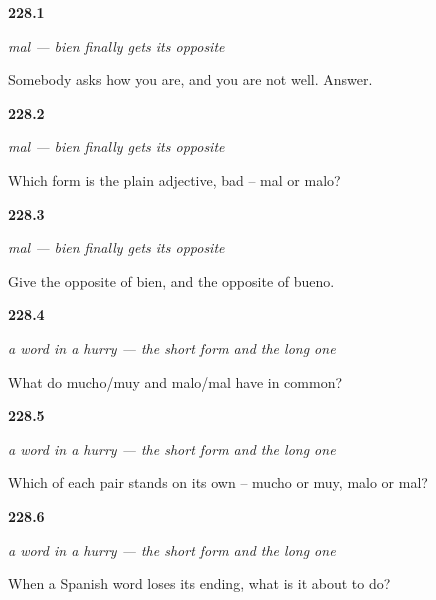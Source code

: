 \noindent\begin{minipage}[t]{\linewidth}
\raggedright
\hypertarget{review-ES-C60-mal-say}{\textbf{228.1}} \emph{mal — bien finally gets its opposite}\par
\small Somebody asks how you are, and you are not well. Answer.
\end{minipage}\par\medskip

\noindent\begin{minipage}[t]{\linewidth}
\raggedright
\hypertarget{review-ES-C60-mal-adj}{\textbf{228.2}} \emph{mal — bien finally gets its opposite}\par
\small Which form is the plain adjective, bad -- mal or malo?
\end{minipage}\par\medskip

\noindent\begin{minipage}[t]{\linewidth}
\raggedright
\hypertarget{review-ES-C60-mal-pairs}{\textbf{228.3}} \emph{mal — bien finally gets its opposite}\par
\small Give the opposite of bien, and the opposite of bueno.
\end{minipage}\par\medskip

\noindent\begin{minipage}[t]{\linewidth}
\raggedright
\hypertarget{review-ES-C60-apocope-pattern}{\textbf{228.4}} \emph{a word in a hurry — the short form and the long one}\par
\small What do mucho/muy and malo/mal have in common?
\end{minipage}\par\medskip

\noindent\begin{minipage}[t]{\linewidth}
\raggedright
\hypertarget{review-ES-C60-apocope-which}{\textbf{228.5}} \emph{a word in a hurry — the short form and the long one}\par
\small Which of each pair stands on its own -- mucho or muy, malo or mal?
\end{minipage}\par\medskip

\noindent\begin{minipage}[t]{\linewidth}
\raggedright
\hypertarget{review-ES-C60-apocope-hear}{\textbf{228.6}} \emph{a word in a hurry — the short form and the long one}\par
\small When a Spanish word loses its ending, what is it about to do?
\end{minipage}\par\medskip

